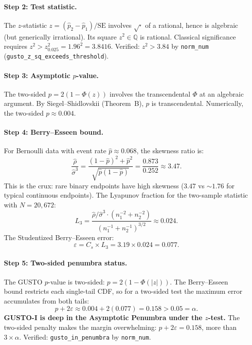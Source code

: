 \documentclass[11pt,a4paper]{article}
\theoremstyle{plain}
\theoremstyle{definition}
\newcommand{\Q}{\mathbb{Q}}
\renewcommand{\Phi}{\varPhi}
\begin{document}
\paragraph{Step 2: Test statistic.}  The $z$-statistic $z = (\hat p_2 - \hat p_1)/\mathrm{SE}$ involves $\sqrt{\cdot}$ of a rational, hence is algebraic (but generically irrational).  Its square $z^2 \in \Q$ is rational.  Classical significance requires $z^2 > z_{0.025}^2 = 1.96^2 = 3.8416$.  Verified: $z^2 > 3.84$ by \texttt{norm\_num} (\texttt{gusto\_z\_sq\_exceeds\_threshold}).

\paragraph{Step 3: Asymptotic $p$-value.}  The two-sided $p = 2(1 - \Phi(z))$ involves the transcendental $\Phi$ at an algebraic argument.  By Siegel--Shidlovskii (Theorem~B), $p$ is transcendental.  Numerically, the two-sided $p \approx 0.004$.

\paragraph{Step 4: Berry--Esseen bound.}  For Bernoulli data with event rate $\hat p \approx 0.068$, the skewness ratio is:
\[
  \frac{\hat\rho}{\hat\sigma^3} = \frac{(1-\hat p)^2 + \hat p^2}{\sqrt{\hat p(1-\hat p)}} = \frac{0.873}{0.252} \approx 3.47.
\]
This is the crux: rare binary endpoints have high skewness ($3.47$ vs $\sim 1.76$ for typical continuous endpoints).  The Lyapunov fraction for the two-sample statistic with $N = 20{,}672$:
\[
  L_3 = \frac{\hat\rho/\hat\sigma^3 \cdot (n_1^{-2} + n_2^{-2})}{(n_1^{-1} + n_2^{-1})^{3/2}} \approx 0.024.
\]
The Studentized Berry--Esseen error:
\[
  \varepsilon = C_s \times L_3 = 3.19 \times 0.024 = 0.077.
\]

\paragraph{Step 5: Two-sided penumbra status.}  The GUSTO $p$-value is two-sided: $p = 2(1 - \Phi(|z|))$.  The Berry--Esseen bound restricts each single-tail CDF, so for a two-sided test the maximum error accumulates from both tails:
\[
  p + 2\varepsilon \approx 0.004 + 2(0.077) = 0.158 > 0.05 = \alpha.
\]
\textbf{GUSTO-I is deep in the Asymptotic Penumbra under the $z$-test.}  The two-sided penalty makes the margin overwhelming: $p + 2\varepsilon = 0.158$, more than $3\times\alpha$.  Verified: \texttt{gusto\_in\_penumbra} by \texttt{norm\_num}.
\end{document}
